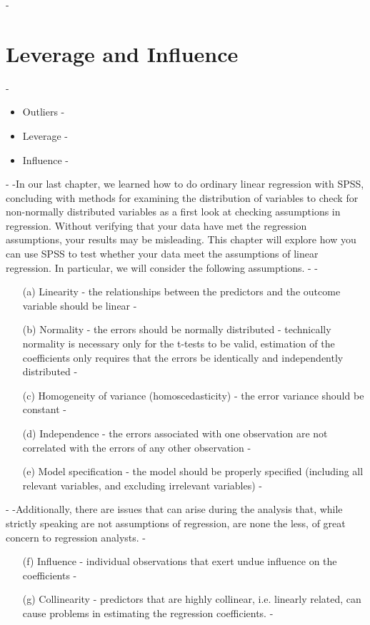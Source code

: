 -\section{Leverage and Influence}
-\begin{itemize}
-\item Outliers
-\item Leverage
-\item Influence
-\end{itemize}
-
-In our last chapter, we learned how to do ordinary linear regression with SPSS, concluding with methods for examining the distribution of variables to check for non-normally distributed variables as a first look at checking assumptions in regression.  Without verifying that your data have met the regression assumptions, your results may be misleading.  This chapter will explore how you can use SPSS to test whether your data meet the assumptions of linear regression.  In particular, we will consider the following assumptions.
-
-\begin{itemize}
-
-\item[(a)] Linearity - the relationships between the predictors and the outcome variable should be linear
-\item[(b)]Normality - the errors should be normally distributed - technically normality is necessary only for the t-tests to be valid, estimation of the coefficients only requires that the errors be identically and independently distributed
-\item[(c)]Homogeneity of variance (homoscedasticity) - the error variance should be constant
-\item[(d)]Independence - the errors associated with one observation are not correlated with the errors of any other observation
-\item[(e)]Model specification - the model should be properly specified (including all relevant variables, and excluding irrelevant variables)
-\end{itemize}
-
-Additionally, there are issues that can arise during the analysis that, while strictly speaking are not assumptions of regression, are none the less, of great concern to regression analysts.
-\begin{itemize}
-\item[(f)]Influence - individual observations that exert undue influence on the coefficients
-\item[(g)]Collinearity - predictors that are highly collinear, i.e. linearly related, can cause problems in estimating the regression coefficients.
-\end{itemize}
